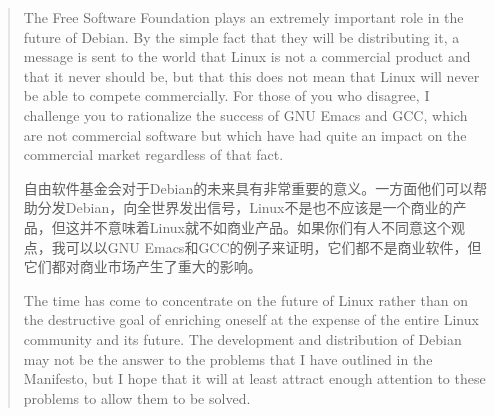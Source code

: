 \ifdefined\eng
\begin{quote}
The Free Software Foundation plays an extremely important role in the future of Debian. By the simple fact that they will be distributing it, a message is sent to the world that Linux is not a commercial product and that it never should be, but that this does not mean that Linux will never be able to compete commercially. For those of you who disagree, I challenge you to rationalize the success of GNU Emacs and GCC, which are not commercial software but which have had quite an impact on the commercial market regardless of that fact.
\fi

\ifdefined\chs
自由软件基金会对于Debian的未来具有非常重要的意义。一方面他们可以帮助分发Debian，向全世界发出信号，Linux不是也不应该是一个商业的产品，但这并不意味着Linux就不如商业产品。如果你们有人不同意这个观点，我可以以GNU Emacs和GCC的例子来证明，它们都不是商业软件，但它们都对商业市场产生了重大的影响。
\fi

\ifdefined\eng
The time has come to concentrate on the future of Linux rather than on the destructive goal of enriching oneself at the expense of the entire Linux community and its future. The development and distribution of Debian may not be the answer to the problems that I have outlined in the Manifesto, but I hope that it will at least attract enough attention to these problems to allow them to be solved.
\end{quote}
\fi

